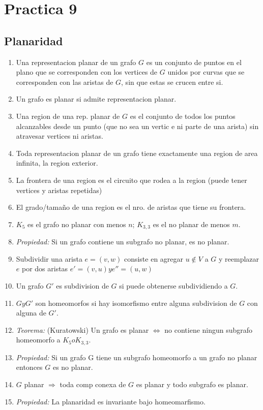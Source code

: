 \section{Practica 9}
\subsection{Planaridad}
\begin{enumerate}
\item Una representacion planar de un grafo $G$ es un conjunto de puntos en el plano que se corresponden con los vertices de $G$ unidos por curvas que se corresponden con las aristas de $G$, sin que estas se crucen entre si.
\item Un grafo es planar si admite representacion planar.
\item Una region de una rep. planar de $G$ es el conjunto de todos los puntos alcanzables desde un punto (que no sea un vertic e ni parte de una arista) sin atravesar vertices ni aristas.
\item Toda representacion planar de un grafo tiene exactamente una region de area infinita, la region exterior.
\item La frontera de una region es el circuito que rodea a la region (puede tener vertices y aristas repetidas)
\item El grado/tamaño de una region es el nro. de aristas que tiene su frontera.
\item $K_{5}$ es el grafo no planar con menos $n$; $K_{3,3}$ es el no planar de menos $m$.
\item \textit{Propiedad:} Si un grafo contiene un subgrafo no planar, es no planar.
\item Subdividir una arista $e=(v,w)$ consiste en agregar $u \notin V$ a $G$ y reemplazar $e$ por dos aristas $e'=(v,u) y e''=(u,w)$
\item Un grafo $G'$ es subdivision de $G$ si puede obtenerse subdividiendo a $G$.
\item $G y G'$ son homeomorfos si hay isomorfismo entre alguna subdivision de $G$ con alguna de $G'$.
\item \textit{Teorema:} (Kuratowski) Un grafo es planar $\iff$ no contiene ningun subgrafo homeomorfo a $K_{5} o K_{3,3}$.
\item \textit{Propiedad:} Si un grafo G tiene un subgrafo homeomorfo a un grafo no planar entonces $G$ es no planar.
\item $G$ planar $\Rightarrow$ toda comp conexa de $G$ es planar y todo subgrafo es planar.
\item \textit{Propiedad:} La planaridad es invariante bajo homeomarfismo.

\end{enumerate}
